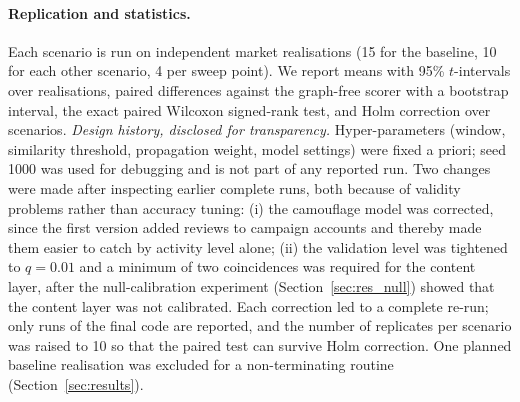 \documentclass[pdflatex,sn-basic]{sn-jnl}
\theoremstyle{thmstyleone}
\theoremstyle{thmstylethree}
\begin{document}
\paragraph{Replication and statistics.} Each scenario is run on independent market realisations (15 for the baseline, 10 for each other scenario, 4 per sweep point). We report means with 95\% $t$-intervals over realisations, paired differences against the graph-free scorer with a bootstrap interval, the exact paired Wilcoxon signed-rank test, and Holm correction over scenarios. \emph{Design history, disclosed for transparency.} Hyper-parameters (window, similarity threshold, propagation weight, model settings) were fixed a priori; seed 1000 was used for debugging and is not part of any reported run. Two changes were made after inspecting earlier complete runs, both because of validity problems rather than accuracy tuning: (i) the camouflage model was corrected, since the first version added reviews to campaign accounts and thereby made them easier to catch by activity level alone; (ii) the validation level was tightened to $q=0.01$ and a minimum of two coincidences was required for the content layer, after the null-calibration experiment (Section~\ref{sec:res_null}) showed that the content layer was not calibrated. Each correction led to a complete re-run; only runs of the final code are reported, and the number of replicates per scenario was raised to 10 so that the paired test can survive Holm correction. One planned baseline realisation was excluded for a non-terminating routine (Section~\ref{sec:results}).
\end{document}
